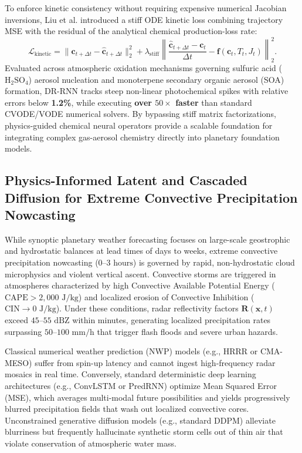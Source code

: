 To enforce kinetic consistency without requiring expensive numerical Jacobian inversions, Liu et al. introduced a stiff ODE kinetic loss combining trajectory MSE with the residual of the analytical chemical production-loss rate:
\begin{equation}
    \mathcal{L}_{\text{kinetic}} = \|\mathbf{c}_{t+\Delta t} - \hat{\mathbf{c}}_{t+\Delta t}\|_2^2 + \lambda_{\text{stiff}} \left\| \frac{\hat{\mathbf{c}}_{t+\Delta t} - \mathbf{c}_t}{\Delta t} - \mathbf{f}(\mathbf{c}_t, T_t, J_t) \right\|_2^2.
    \label{eq:stiff_ode_loss}
\end{equation}
Evaluated across atmospheric oxidation mechanisms governing sulfuric acid ($\text{H}_2\text{SO}_4$) aerosol nucleation and monoterpene secondary organic aerosol (SOA) formation, DR-RNN tracks steep non-linear photochemical spikes with relative errors below \textbf{1.2\%}, while executing \textbf{over $50\times$ faster} than standard CVODE/VODE numerical solvers. By bypassing stiff matrix factorizations, physics-guided chemical neural operators provide a scalable foundation for integrating complex gas-aerosol chemistry directly into planetary foundation models.

\subsection{Physics-Informed Latent and Cascaded Diffusion for Extreme Convective Precipitation Nowcasting}
\label{sec:physics_latent_diffusion_precipitation}
While synoptic planetary weather forecasting focuses on large-scale geostrophic and hydrostatic balances at lead times of days to weeks, extreme convective precipitation nowcasting ($0\text{--}3\text{ hours}$) is governed by rapid, non-hydrostatic cloud microphysics and violent vertical ascent. Convective storms are triggered in atmospheres characterized by high Convective Available Potential Energy ($\text{CAPE} > 2{,}000\text{ J/kg}$) and localized erosion of Convective Inhibition ($\text{CIN} \to 0\text{ J/kg}$). Under these conditions, radar reflectivity factors $\mathbf{R}(\mathbf{x}, t)$ exceed $45\text{--}55\text{ dBZ}$ within minutes, generating localized precipitation rates surpassing $50\text{--}100\text{ mm/h}$ that trigger flash floods and severe urban hazards.

Classical numerical weather prediction (NWP) models (e.g., HRRR or CMA-MESO) suffer from spin-up latency and cannot ingest high-frequency radar mosaics in real time. Conversely, standard deterministic deep learning architectures (e.g., ConvLSTM or PredRNN) optimize Mean Squared Error (MSE), which averages multi-modal future possibilities and yields progressively blurred precipitation fields that wash out localized convective cores. Unconstrained generative diffusion models (e.g., standard DDPM) alleviate blurriness but frequently hallucinate synthetic storm cells out of thin air that violate conservation of atmospheric water mass.

